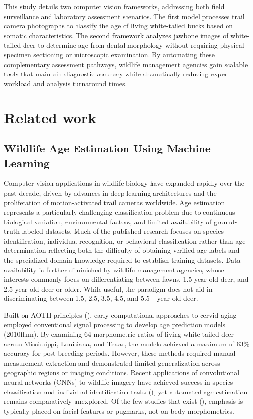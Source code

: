 \documentclass{iopjournal}
\begin{document}
This study details two computer vision frameworks, addressing both field surveillance and laboratory assessment scenarios. The first model processes trail camera photographs to classify the age of living white-tailed bucks based on somatic characteristics. The second framework analyzes jawbone images of white-tailed deer to determine age from dental morphology without requiring physical specimen sectioning or microscopic examination. By automating these complementary assessment pathways, wildlife management agencies gain scalable tools that maintain diagnostic accuracy while dramatically reducing expert workload and analysis turnaround times.

\section{Related work}
\subsection{Wildlife Age Estimation Using Machine Learning}
Computer vision applications in wildlife biology have expanded rapidly over the past decade, driven by advances in deep learning architectures and the proliferation of motion-activated trail cameras worldwide. Age estimation represents a particularly challenging classification problem due to continuous biological variation, environmental factors, and limited availability of ground-truth labeled datasets. Much of the published research focuses on species identification, individual recognition, or behavioral classification rather than age determination reflecting both the difficulty of obtaining verified age labels and the specialized domain knowledge required to establish training datasets. Data availability is further diminished by wildlife management agencies, whose interests commonly focus on differentiating between fawns, 1.5 year old deer, and 2.5 year old deer or older. While useful, the paradigm does not aid in discriminating between 1.5, 2.5, 3.5, 4.5, and 5.5+ year old deer.
 
Built on AOTH principles (\cite{1978Knowlton,1996Kroll,1999Demarais,2003Richards,2008Hellickson,2013Gee}), early computational approaches to cervid aging employed conventional signal processing to develop age prediction models (2010flinn). By examining 64 morphometric ratios of living white-tailed deer across Mississippi, Louisiana, and Texas, the models achieved a maximum of $63\%$ accuracy for post-breeding periods. However, these methods required manual measurement extraction and demonstrated limited generalization across geographic regions or imaging conditions. Recent applications of convolutional neural networks (CNNs) to wildlife imagery have achieved success in species classification and individual identification tasks (\cite{2019favorskaya,2023hindarto,2024sharma,2025Roca}), yet automated age estimation remains comparatively unexplored. Of the few studies that exist (\cite{2022mazurek,2022qi,2023saini}), emphasis is typically placed on facial features or pugmarks, not on body morphometrics.
\end{document}

